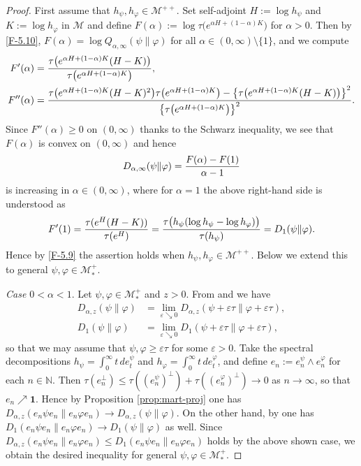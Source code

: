 \documentclass[12pt]{article}
\theoremstyle{definition}
\theoremstyle{remark}
\numberwithin{equation}{section}
\def\Me{\mathcal M}
\def\ffi{\varphi}
\def\1{\mathbf{1}}
\def\eps{\varepsilon}
\def\bN{\mathbb{N}}
\begin{document}
\begin{proof}
First assume that $h_\psi,h_\ffi\in\Me^{++}$. Set self-adjoint $H:=\log h_\psi$ and $K:=\log h_\ffi$ in $\Me$
and define $F(\alpha):=\log\tau\bigl(e^{\alpha H+(1-\alpha)K}\bigr)$ for $\alpha>0$.
Then by \eqref{F-5.10}, $F(\alpha)=\log Q_{\alpha,\infty}(\psi\|\ffi)$ for all $\alpha\in(0,\infty)\setminus\{1\}$,
and we compute
\begin{align*}
F'(\alpha)&={\tau\bigl(e^{\alpha H+(1-\alpha)K}(H-K)\bigr)\over\tau\bigl(e^{\alpha H+(1-\alpha)K}\bigr)}, \\
F''(\alpha)&={\tau\bigl(e^{\alpha H+(1-\alpha)K}(H-K)^2\bigr)\tau\bigl(e^{\alpha
H+(1-\alpha)K}\bigr)-\bigl\{\tau\bigl(e^{\alpha H+(1-\alpha)K}(H-K)\bigr)\bigr\}^2
\over\bigl\{\tau\bigl(e^{\alpha H+(1-\alpha)K}\bigr)\bigr\}^2}.
\end{align*}
Since $F''(\alpha)\ge0$ on $(0,\infty)$ thanks to the Schwarz inequality, we see that $F(\alpha)$ is
convex on $(0,\infty)$ and hence
\[
D_{\alpha,\infty}(\psi\|\ffi)={F(\alpha)-F(1)\over\alpha-1}
\]
is increasing in $\alpha\in(0,\infty)$, where for $\alpha=1$ the above right-hand side is understood as
\[
F'(1)={\tau(e^H(H-K))\over\tau(e^H)}={\tau\bigl(h_\psi(\log h_\psi-\log h_\ffi)\bigr)\over\tau(h_\psi)}
=D_1(\psi\|\ffi).
\]
Hence by \eqref{F-5.9} the assertion holds when $h_\psi,h_\ffi\in\Me^{++}$. Below we extend this to
general $\psi,\ffi\in\Me_*^+$.

{\it Case $0<\alpha<1$}.\enspace
Let $\psi,\ffi\in\Me_*^+$ and $z>0$. From \cite[Theorem 1(iv)]{kato2023onrenyi} and
\cite[Corollary 2.8(3)]{hiai2021quantum} we have
\begin{align*}
D_{\alpha,z}(\psi\|\ffi)&=\lim_{\eps\searrow0}D_{\alpha,z}(\psi+\eps\tau\|\ffi+\eps\tau), \\
D_1(\psi\|\ffi)&=\lim_{\eps\searrow0}D_1(\psi+\eps\tau\|\ffi+\eps\tau),
\end{align*}
so that we may assume that $\psi,\ffi\ge\eps\tau$ for some $\eps>0$. Take the spectral decompositions
$h_\psi=\int_0^\infty t\,de_t^\psi$ and $h_\ffi=\int_0^\infty t\,de_t^\ffi$, and define
$e_n:=e_n^\psi\wedge e_n^\ffi$ for each $n\in\bN$. Then
$\tau(e_n^\perp)\le\tau((e_n^\psi)^\perp)+\tau((e_n^\ffi)^\perp)\to0$ as $n\to\infty$,
so that $e_n\nearrow\1$. Hence by Proposition \ref{prop:mart-proj} one has
$D_{\alpha,z}(e_n\psi e_n\|e_n\ffi e_n)\to D_{\alpha,z}(\psi\|\ffi)$. On the other hand,
by \cite[Proposition 2.10]{hiai2021quantum} one has
$D_1(e_n\psi e_n\|e_n\ffi e_n)\to D_1(\psi\|\ffi)$ as well. Since
$D_{\alpha,z}(e_n\psi e_n\|e_n\ffi e_n)\le D_1(e_n\psi e_n\|e_n\ffi e_n)$
holds by the above shown case, we obtain the desired inequality for general $\psi,\ffi\in\Me_*^+$.


\end{proof}
\end{document}
